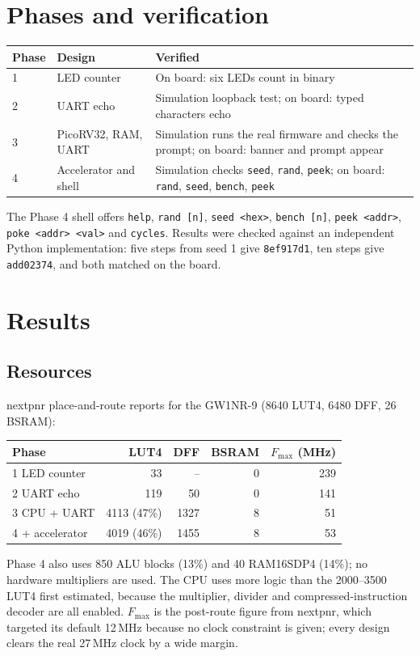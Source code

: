 \documentclass[11pt,a4paper]{article}
\begin{document}
\section{Phases and verification}
\begin{tabular}{@{}llp{7.4cm}@{}}\toprule
Phase & Design & Verified\\\midrule
1 & LED counter & On board: six LEDs count in binary\\
2 & UART echo & Simulation loopback test; on board: typed characters echo\\
3 & PicoRV32, RAM, UART & Simulation runs the real firmware and checks the prompt; on board: banner and prompt appear\\
4 & Accelerator and shell & Simulation checks \texttt{seed}, \texttt{rand}, \texttt{peek}; on board: \texttt{rand}, \texttt{seed}, \texttt{bench}, \texttt{peek}\\\bottomrule
\end{tabular}

\medskip\noindent The Phase 4 shell offers \texttt{help}, \texttt{rand [n]}, \texttt{seed <hex>}, \texttt{bench [n]}, \texttt{peek <addr>}, \texttt{poke <addr> <val>} and \texttt{cycles}.
Results were checked against an independent Python implementation: five steps from seed 1 give \texttt{8ef917d1}, ten steps give \texttt{add02374}, and both matched on the board.

\section{Results}
\subsection{Resources}
nextpnr place-and-route reports for the GW1NR-9 (8640 LUT4, 6480 DFF, 26 BSRAM):
\begin{center}
\begin{tabular}{@{}lrrrr@{}}\toprule
Phase & LUT4 & DFF & BSRAM & $F_{\max}$ (MHz)\\\midrule
1 LED counter & 33 & -- & 0 & 239\\
2 UART echo & 119 & 50 & 0 & 141\\
3 CPU + UART & 4113 (47\%) & 1327 & 8 & 51\\
4 + accelerator & 4019 (46\%) & 1455 & 8 & 53\\\bottomrule
\end{tabular}
\end{center}
Phase 4 also uses 850 ALU blocks (13\%) and 40 RAM16SDP4 (14\%); no hardware multipliers are used.
The CPU uses more logic than the 2000--3500 LUT4 first estimated, because the multiplier, divider and compressed-instruction decoder are all enabled.
$F_{\max}$ is the post-route figure from nextpnr, which targeted its default 12\,MHz because no clock constraint is given; every design clears the real 27\,MHz clock by a wide margin.
\end{document}
